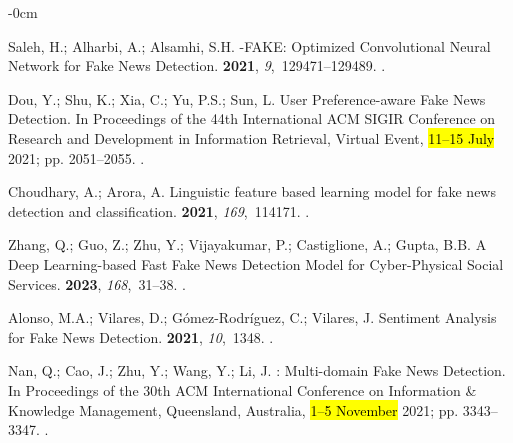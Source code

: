 \documentclass[electronics,article,accept,pdftex,moreauthors,electronics]{Definitions/mdpi}
\begin{document}
\begin{adjustwidth}{-\extralength}{0cm}

\begin{thebibliography}{999}

Saleh, H.; Alharbi, A.; Alsamhi, S.H.
-{FAKE}: {Optimized} {Convolutional} {Neural} {Network} for
  {Fake} {News} {Detection}.
 {\bf 2021}, {\em 9},~129471--129489.
.

Dou, Y.; Shu, K.; Xia, C.; Yu, P.S.; Sun, L.
\newblock User {Preference}-aware {Fake} {News} {Detection}.
\newblock In Proceedings of the 44th {International} {ACM}
  {SIGIR} {Conference} on {Research} and {Development} in {Information}
  {Retrieval}, Virtual Event, \hl{11--15 July} %
 2021; pp. 2051--2055.
.

Choudhary, A.; Arora, A.
\newblock Linguistic feature based learning model for fake news detection and
  classification.
 {\bf 2021}, {\em 169},~114171.
.

Zhang, Q.; Guo, Z.; Zhu, Y.; Vijayakumar, P.; Castiglione, A.; Gupta, B.B.
\newblock A {Deep} {Learning}-based {Fast} {Fake} {News} {Detection} {Model}
  for {Cyber}-{Physical} {Social} {Services}.
 {\bf 2023}, {\em 168},~31--38.
.

Alonso, M.A.; Vilares, D.; Gómez-Rodríguez, C.; Vilares, J.
\newblock Sentiment {Analysis} for {Fake} {News} {Detection}.
 {\bf 2021}, {\em 10},~1348.
.

Nan, Q.; Cao, J.; Zhu, Y.; Wang, Y.; Li, J.
: {Multi}-domain {Fake} {News} {Detection}.
\newblock In Proceedings of the  30th {ACM} {International}
  {Conference} on {Information} \& {Knowledge} {Management}, Queensland, Australia, \hl{1--5 	November} %
 2021; pp. 3343--3347.
.


\end{thebibliography}
\end{adjustwidth}
\end{document}

